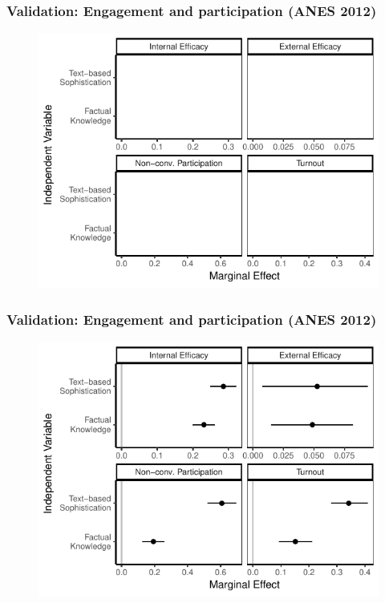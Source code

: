 \documentclass{beamer}
\begin{document}
\begin{frame} %
\frametitle{Validation: Engagement and participation (ANES 2012)}
  \begin{figure}
  \includegraphics{../fig/knoweff_empty.pdf}
  \end{figure}
\end{frame}
\begin{frame} %
\frametitle{Validation: Engagement and participation (ANES 2012)}
  \begin{figure}
  \includegraphics{../fig/knoweff_pres.pdf}
  \end{figure}
\end{frame}
\end{document}
